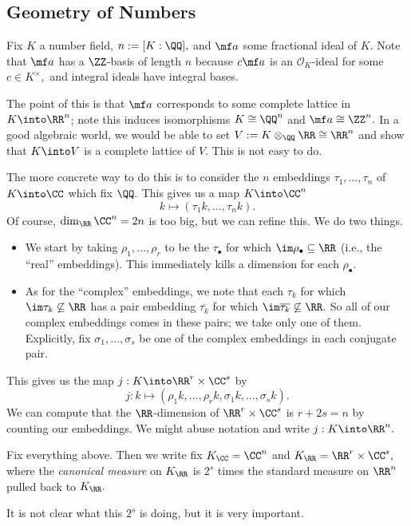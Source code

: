 \subsection{Geometry of Numbers}
Fix $K$ a number field, $n:=[K:\QQ],$ and $\mf a$ some fractional ideal of $K.$ Note that $\mf a$ has a $\ZZ$-basis of length $n$ because $c\mf a$ is an $\mathcal O_K$-ideal for some $c\in K^\times,$ and integral ideals have integral bases.

The point of this is that $\mf a$ corresponds to some complete lattice in $K\into\RR^n$; note this induces isomorphisms $K\cong\QQ^n$ and $\mf a\cong\ZZ^n.$ In a good algebraic world, we would be able to set $V:=K\otimes_\QQ\RR\cong\RR^n$ and show that $K\into V$ is a complete lattice of $V.$ This is not easy to do.

The more concrete way to do this is to consider the $n$ embeddings $\tau_1,\ldots,\tau_n$ of $K\into\CC$ which fix $\QQ.$ This gives us a map $K\into\CC^n$
\[k\longmapsto(\tau_1k,\ldots,\tau_nk).\]
Of course, $\dim_\RR\CC^n=2n$ is too big, but we can refine this. We do two things.
\begin{itemize}
    \item We start by taking $\rho_1,\ldots,\rho_r$ to be the $\tau_\bullet$ for which $\im\rho_\bullet\subseteq\RR$ (i.e., the ``real'' embeddings). This immediately kills a dimension for each $\rho_\bullet.$
    \item As for the ``complex'' embeddings, we note that each $\tau_k$ for which $\im\tau_k\not\subseteq\RR$ has a pair embedding $\overline{\tau_k}$ for which $\im\overline{\tau_k}\not\subseteq\RR.$ So all of our complex embeddings comes in these pairs; we take only one of them. Explicitly, fix $\sigma_1,\ldots,\sigma_s$ be one of the complex embeddings in each conjugate pair.
\end{itemize}
This gives us the map $j:K\into\RR^r\times\CC^s$ by
\[j:k\longmapsto(\rho_1k,\ldots,\rho_rk,\sigma_1k,\ldots,\sigma_sk).\]
We can compute that the $\RR$-dimension of $\RR^r\times\CC^s$ is $r+2s=n$ by counting our embeddings. We might abuse notation and write $j:K\into\RR^n.$
\begin{definition}
    Fix everything above. Then we write fix $K_\CC=\CC^n$ and $K_\RR=\RR^r\times\CC^s,$ where the \textit{canonical measure} on $K_\RR$ is $2^s$ times the standard measure on $\RR^n$ pulled back to $K_\RR.$
\end{definition}
It is not clear what this $2^s$ is doing, but it is very important.